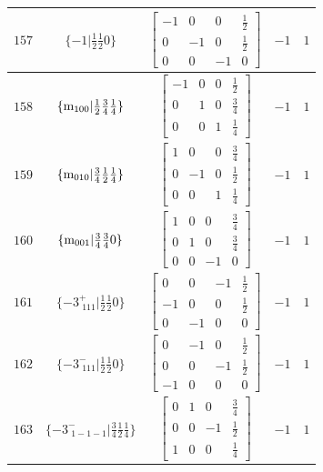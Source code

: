 \documentclass[fleqn,8pt]{jsarticle}
\begin{document}
\begin{longtable}{ccccc}
$ 157 $ & $ \{-1|\frac{1}{2} \frac{1}{2} 0\} $ & $ \begin{bmatrix} -1 & 0 & 0 & \frac{1}{2} \\ 0 & -1 & 0 & \frac{1}{2} \\ 0 & 0 & -1 & 0 \end{bmatrix} $ & $ -1 $ & $ 1 $ \\ \hline
$ 158 $ & $ \{{\rm m}_{100}|\frac{1}{2} \frac{3}{4} \frac{1}{4}\} $ & $ \begin{bmatrix} -1 & 0 & 0 & \frac{1}{2} \\ 0 & 1 & 0 & \frac{3}{4} \\ 0 & 0 & 1 & \frac{1}{4} \end{bmatrix} $ & $ -1 $ & $ 1 $ \\ \hline
$ 159 $ & $ \{{\rm m}_{010}|\frac{3}{4} \frac{1}{2} \frac{1}{4}\} $ & $ \begin{bmatrix} 1 & 0 & 0 & \frac{3}{4} \\ 0 & -1 & 0 & \frac{1}{2} \\ 0 & 0 & 1 & \frac{1}{4} \end{bmatrix} $ & $ -1 $ & $ 1 $ \\ \hline
$ 160 $ & $ \{{\rm m}_{001}|\frac{3}{4} \frac{3}{4} 0\} $ & $ \begin{bmatrix} 1 & 0 & 0 & \frac{3}{4} \\ 0 & 1 & 0 & \frac{3}{4} \\ 0 & 0 & -1 & 0 \end{bmatrix} $ & $ -1 $ & $ 1 $ \\ \hline
$ 161 $ & $ \{-3^{+}_{\,\,111}|\frac{1}{2} \frac{1}{2} 0\} $ & $ \begin{bmatrix} 0 & 0 & -1 & \frac{1}{2} \\ -1 & 0 & 0 & \frac{1}{2} \\ 0 & -1 & 0 & 0 \end{bmatrix} $ & $ -1 $ & $ 1 $ \\ \hline
$ 162 $ & $ \{-3^{-}_{\,\,111}|\frac{1}{2} \frac{1}{2} 0\} $ & $ \begin{bmatrix} 0 & -1 & 0 & \frac{1}{2} \\ 0 & 0 & -1 & \frac{1}{2} \\ -1 & 0 & 0 & 0 \end{bmatrix} $ & $ -1 $ & $ 1 $ \\ \hline
$ 163 $ & $ \{-3^{-}_{\,\,1-1-1}|\frac{3}{4} \frac{1}{2} \frac{1}{4}\} $ & $ \begin{bmatrix} 0 & 1 & 0 & \frac{3}{4} \\ 0 & 0 & -1 & \frac{1}{2} \\ 1 & 0 & 0 & \frac{1}{4} \end{bmatrix} $ & $ -1 $ & $ 1 $ \\ \hline

\end{longtable}
\end{document}
